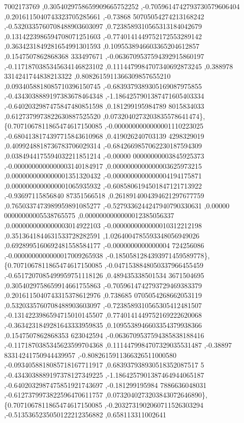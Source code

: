 \begin{DoxyCode}
      7002173769 ,0.3054029758659909665752252 ,-0.7059614742793730579606404 ,0.2016115040743323705285661 ,-0.73868
      50705054274213168242 ,-0.5320335760708488903603097 ,0.7238589310565313184042679 ,0.1314223986594708071251603
       ,-0.7740141449752172553289142 ,0.3634231849281654991301593 ,0.1095538946603365204612857 ,0.1547507862868368
      333497671 ,-0.0636709537594392915860197 ,-0.1171870385345634146823102 ,0.1114479984707340692873245 ,0.388978
      3314241744838213322 ,0.8082615911366309857655210 ,0.0934058818085710396150745 ,-0.6839379389305169087975855 
      ,-0.4343038889197383678464348 ,-1.1864257901387471605403334 ,-0.6402032987475847480851598 ,0.181299195984789
      8015834033 ,0.6127379973822630887525520 ,0.0732040273203835578641474\},
\{0.7071067811865474617150085 ,-0.0000000000000001110223025 ,-0.6804138174397715843610968 ,0.419026240703139
      4298329019 ,0.4099248818736783706029314 ,-0.6842669857062230187594309 ,0.0384944175594032211851214 ,-0.00000
      00000000003845925373 ,-0.0000000000000003140184917 ,0.0000000000000003625973215 ,0.0000000000000001351320432
       ,-0.0000000000000004194175871 ,0.0000000000000001065935932 ,-0.6085806194501847121713922 ,-0.93697115856840
      87351566518 ,0.2618914004394621297677759 ,0.7650337473989959891085277 ,-0.5279336244247940790330631 ,0.00000
      00000000005538765575 ,0.0000000000000012385056337 ,0.0000000000000003014922103 ,-0.0000000000000010312212198
       ,0.3513641844631533728282591 ,1.0264004785593348056949026 ,0.6928995160692481558584177 ,-0.0000000000000004
      724256086 ,-0.0000000000000017009265938 ,-0.1850581284393971459589778\},
\{0.7071067811865474617150085 ,-0.0471538848050337966455459 ,-0.6517207085499959751118126 ,0.489435338501534
      3671504695 ,0.3054029758659914661755863 ,-0.7059614742793729469383379 ,0.2016115040743315378612976 ,0.738685
      0705054268662053119 ,0.5320335760708488903603097 ,-0.7238589310565305412481507 ,-0.1314223986594715010145507
       ,0.7740141449752169222620068 ,-0.3634231849281643333959835 ,0.1095538946603354379938366 ,0.1547507862868353
      623042594 ,-0.0636709537594385838188416 ,-0.1171870385345623599704368 ,0.1114479984707329035531487 ,-0.38897
      83314241750944439957 ,-0.8082615911366326511000580 ,-0.0934058818085718167711917 ,0.683937938930518352087517
      5 ,-0.4343038889197378127349225 ,-1.1864257901387464944065187 ,-0.6402032987475851921743697 ,-0.181299195984
      7886636048031 ,-0.6127379973822596470611757 ,0.0732040273203843072646890\},
\{0.7071067811865474617150085 ,-0.2032731902060711526303294 ,-0.5135365235050122212356882 ,0.658113311002641

\end{DoxyCode}
